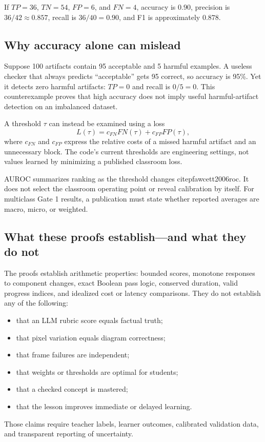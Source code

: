 \documentclass[11pt]{article}
\theoremstyle{plain}
\theoremstyle{definition}
\begin{document}
If $TP=36$, $TN=54$, $FP=6$, and $FN=4$, accuracy is $0.90$, precision is $36/42\approx0.857$, recall is $36/40=0.90$, and F1 is approximately $0.878$.

\subsection{Why accuracy alone can mislead}

Suppose 100 artifacts contain 95 acceptable and 5 harmful examples. A useless checker that always predicts ``acceptable'' gets 95 correct, so accuracy is 95\%. Yet it detects zero harmful artifacts: $TP=0$ and recall is $0/5=0$. This counterexample proves that high accuracy does not imply useful harmful-artifact detection on an imbalanced dataset.

A threshold $\tau$ can instead be examined using a loss
\begin{equation}
L(\tau)=c_{FN}FN(\tau)+c_{FP}FP(\tau),
\end{equation}
where $c_{FN}$ and $c_{FP}$ express the relative costs of a missed harmful artifact and an unnecessary block. The code's current thresholds are engineering settings, not values learned by minimizing a published classroom loss.

AUROC summarizes ranking as the threshold changes citep{fawcett2006roc}. It does not select the classroom operating point or reveal calibration by itself. For multiclass Gate 1 results, a publication must state whether reported averages are macro, micro, or weighted.

\subsection{What these proofs establish---and what they do not}

The proofs establish arithmetic properties: bounded scores, monotone responses to component changes, exact Boolean pass logic, conserved duration, valid progress indices, and idealized cost or latency comparisons. They do not establish any of the following:
\begin{itemize}
  \item that an LLM rubric score equals factual truth;
  \item that pixel variation equals diagram correctness;
  \item that frame failures are independent;
  \item that weights or thresholds are optimal for students;
  \item that a checked concept is mastered;
  \item that the lesson improves immediate or delayed learning.
\end{itemize}
Those claims require teacher labels, learner outcomes, calibrated validation data, and transparent reporting of uncertainty.
\end{document}
